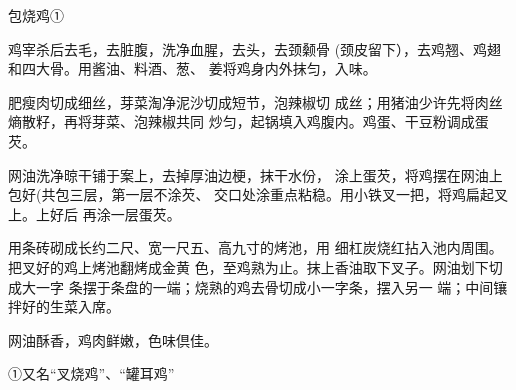 \begin{recipe}{包烧鸡①}

\ingredients



\cooking

\step 鸡宰杀后去毛，去脏腹，洗净血腥，去头，去颈颡骨 (颈皮留下），去鸡翘、鸡翅和四大骨。用酱油、料酒、葱、 姜将鸡身内外抹匀，入味。

\step 肥瘦肉切成细丝，芽菜淘净泥沙切成短节，泡辣椒切 成丝；用猪油少许先将肉丝熵散籽，再将芽菜、泡辣椒共同 炒匀，起锅填入鸡腹内。鸡蛋、干豆粉调成蛋芡。

\step 网油洗净晾干铺于案上，去掉厚油边梗，抹干水份， 涂上蛋芡，将鸡摆在网油上包好(共包三层，第一层不涂芡、 交口处涂重点粘稳。用小铁叉一把，将鸡扁起叉上。上好后 再涂一层蛋芡。

\step 用条砖砌成长约二尺、宽一尺五、高九寸的烤池，用 细杠炭烧红拈入池内周围。把叉好的鸡上烤池翻烤成金黄 色，至鸡熟为止。抹上香油取下叉子。网油划下切成大一字 条摆于条盘的一端；烧熟的鸡去骨切成小一字条，摆入另一 端；中间镶拌好的生菜入席。

\notes

网油酥香，鸡肉鲜嫩，色味倶佳。

①又名“叉烧鸡”、“罐耳鸡”

\end{recipe}

